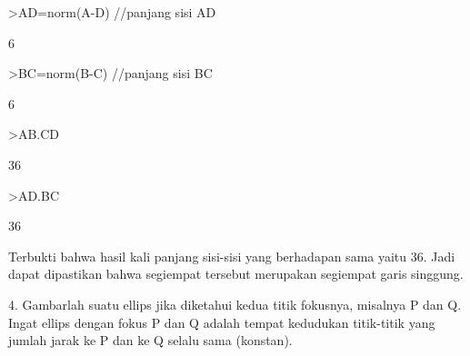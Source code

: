 \documentclass[a4paper,10pt]{article}
\begin{document}
\begin{eulernotebook}
\begin{eulercomment}
\begin{eulercomment}
\begin{eulercomment}
\begin{eulercomment}
\begin{eulercomment}
\begin{eulercomment}
\begin{eulercomment}
\begin{eulercomment}
\begin{eulercomment}
\begin{eulercomment}
\begin{eulercomment}
\begin{eulercomment}
\begin{eulercomment}
\begin{eulercomment}
\begin{eulercomment}
\begin{eulercomment}
\begin{eulerprompt}
>AD=norm(A-D) //panjang sisi AD
\end{eulerprompt}
\begin{euleroutput}
  6
\end{euleroutput}
\begin{eulerprompt}
>BC=norm(B-C) //panjang sisi BC
\end{eulerprompt}
\begin{euleroutput}
  6
\end{euleroutput}
\begin{eulerprompt}
>AB.CD
\end{eulerprompt}
\begin{euleroutput}
  36
\end{euleroutput}
\begin{eulerprompt}
>AD.BC
\end{eulerprompt}
\begin{euleroutput}
  36
\end{euleroutput}
\begin{eulercomment}
Terbukti bahwa hasil kali panjang sisi-sisi yang berhadapan sama yaitu
36. Jadi dapat dipastikan bahwa segiempat tersebut merupakan segiempat
garis singgung.


4. Gambarlah suatu ellips jika diketahui kedua titik fokusnya,
misalnya P dan Q. Ingat ellips dengan fokus P dan Q adalah tempat
kedudukan titik-titik yang jumlah jarak ke P dan ke Q selalu sama
(konstan).


\end{eulercomment}
\end{eulercomment}
\end{eulercomment}
\end{eulercomment}
\end{eulercomment}
\end{eulercomment}
\end{eulercomment}
\end{eulercomment}
\end{eulercomment}
\end{eulercomment}
\end{eulercomment}
\end{eulercomment}
\end{eulercomment}
\end{eulercomment}
\end{eulercomment}
\end{eulercomment}
\end{eulercomment}
\end{eulernotebook}
\end{document}
